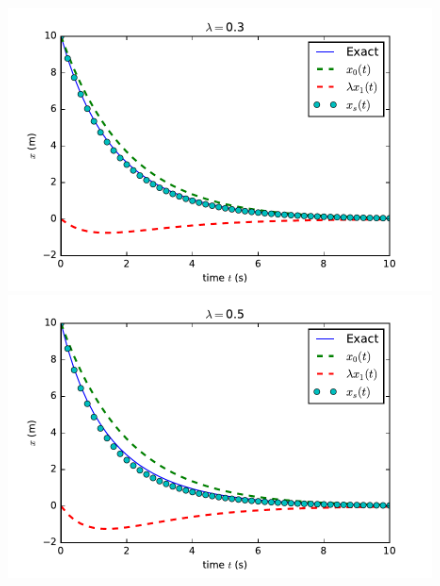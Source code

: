 \documentclass[a4paper,10pt]{article}
\begin{document}
\begin{figure}[!hp]
\hspace*{-2.1cm}\includegraphics[width=4.5in]{PT_lambda=03.pdf}\hspace*{-1.1cm}\includegraphics[width=4.5in]{PT_lambda=05.pdf}\\

\end{figure}
\end{document}
